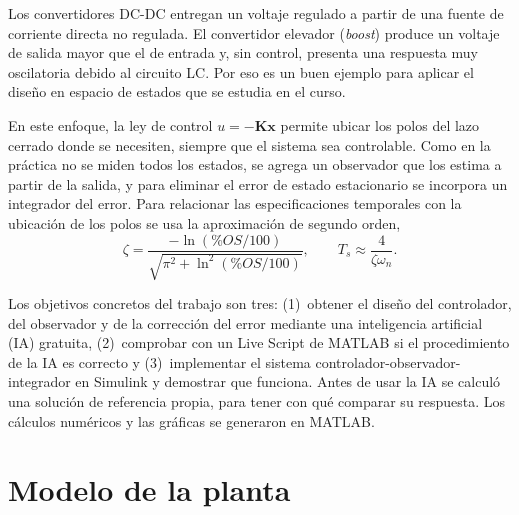 \documentclass[conference,a4paper]{IEEEtran}
\begin{document}
Los convertidores DC-DC entregan un voltaje regulado a partir de una fuente de corriente directa no regulada. El convertidor elevador (\emph{boost}) produce un voltaje de salida mayor que el de entrada y, sin control, presenta una respuesta muy oscilatoria debido al circuito LC. Por eso es un buen ejemplo para aplicar el diseño en espacio de estados que se estudia en el curso.

En este enfoque, la ley de control $u = -\mathbf{K}\mathbf{x}$ permite ubicar los polos del lazo cerrado donde se necesiten, siempre que el sistema sea controlable. Como en la práctica no se miden todos los estados, se agrega un observador que los estima a partir de la salida, y para eliminar el error de estado estacionario se incorpora un integrador del error. Para relacionar las especificaciones temporales con la ubicación de los polos se usa la aproximación de segundo orden,
\begin{equation}
\zeta = \frac{-\ln(\%OS/100)}{\sqrt{\pi^2 + \ln^2(\%OS/100)}}, \qquad T_s \approx \frac{4}{\zeta\omega_n}.
\label{eq:segundo}
\end{equation}

Los objetivos concretos del trabajo son tres: (1)~obtener el diseño del controlador, del observador y de la corrección del error mediante una inteligencia artificial (IA) gratuita, (2)~comprobar con un Live Script de MATLAB si el procedimiento de la IA es correcto y (3)~implementar el sistema controlador-observador-integrador en Simulink y demostrar que funciona. Antes de usar la IA se calculó una solución de referencia propia, para tener con qué comparar su respuesta. Los cálculos numéricos y las gráficas se generaron en MATLAB.

\section{Modelo de la planta}
\end{document}
